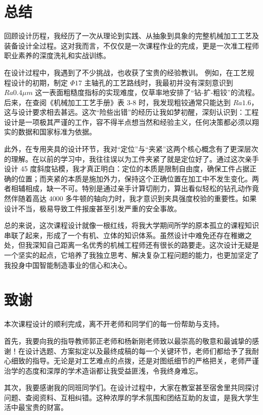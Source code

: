 \documentclass[withoutpreface,bwprint]{cumcmthesis}
\begin{document}
\section{总结}

回顾设计历程，我经历了一次从理论到实践、从抽象到具象的完整机械加工工艺及装备设计全过程。这对我而言，不仅仅是一次课程作业的完成，更是一次准工程师职业素养的深度洗礼和实战训练。

在设计过程中，我遇到了不少挑战，也收获了宝贵的经验教训。
例如，在工艺规程设计的初期，制定 $\Phi17$ 主轴孔的工艺路线时，我最初并没有深刻意识到 $Ra 0.4 \mu m$ 这一表面粗糙度指标的实现难度，仅草率地安排了“钻-扩-粗铰”的流程。后来，在查阅《机械加工工艺手册》表 3-8 时，我发现粗铰通常只能达到 $Ra 1.6$，这与设计要求相去甚远。这次“险些出错”的经历让我如梦初醒，深刻认识到：工程设计是一项极其严谨的工作，容不得半点想当然和经验主义，任何决策都必须以翔实的数据和国家标准为依据。

此外，在专用夹具的设计环节，我对“定位”与“夹紧”这两个核心概念有了更深层次的理解。在以前的学习中，我往往误以为工件夹紧了就是定位好了。通过这次亲手设计 45 度斜度钻模，我才真正明白：定位的本质是限制自由度，确保工件占据正确的位置；而夹紧的本质是施加外力，保持这个正确位置在加工中不发生变化。两者相辅相成，缺一不可。特别是通过亲手计算切削力，算出看似轻松的钻孔动作竟然伴随着高达 4000 多牛顿的轴向力时，我才意识到夹具强度校验的重要性。如果设计不当，极易导致工件报废甚至引发严重的安全事故。

总的来说，这次课程设计就像一根红线，将我大学期间所学的原本孤立的课程知识串联了起来，形成了一个有机、立体的知识体系。虽然设计中难免还存在稚嫩之处，但我深知自己距离一名优秀的机械工程师还有很长的路要走。这次设计无疑是一个坚实的起点，它培养了我独立思考、解决复杂工程问题的能力，也更加坚定了我投身中国智能制造事业的信心和决心。

\newpage
\section{致谢}

本次课程设计的顺利完成，离不开老师和同学们的每一份帮助与支持。

首先，我要向我的指导教师郭正老师和杨新刚老师致以最崇高的敬意和最诚挚的感谢！在设计选题、方案拟定以及最终成稿的每一个关键环节，老师们都给予了我耐心细致的指导。无论是对工艺难点的点拨，还是对图纸细节的严格把关，老师严谨治学的态度和深厚的学术造诣都让我受益匪浅，令我终身难忘。

其次，我要感谢我的同班同学们。在设计过程中，大家在教室甚至宿舍里共同探讨问题、查阅资料、互相纠错。这种浓厚的学术氛围和团结互助的友谊，是我大学生活中最宝贵的财富。
\end{document}
